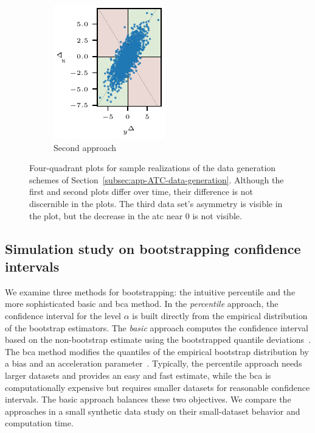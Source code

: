 \documentclass[pdflatex]{sn-jnl}
\theoremstyle{plain}%
\theoremstyle{definition}
\begin{document}
\begin{figure}
\begin{subfigure}{0.24\textwidth}
    \end{subfigure}\hspace{0.01\textwidth}
    \begin{subfigure}{0.24\textwidth}
        \includegraphics{plots/illustrative_examples/appendix_4q_dgp2}
        \caption{Second approach}
    \end{subfigure}
    \caption[Four-quadrant plots for sample realizations of the data generation schemes of Section~\ref{subsec:app-ATC-data-generation}.]{Four-quadrant plots for sample realizations of the data generation schemes of Section~\ref{subsec:app-ATC-data-generation}. Although the first and second plots differ over time, their difference is not discernible in the plots. The third data set's asymmetry is visible in the plot, but the decrease in the \ac{atc} near 0 is not visible. }
    \label{fig:appendix_dgps}
\end{figure}

\subsection{Simulation study on bootstrapping confidence intervals}\label{subsec:appendix-aatc-bootstrap}


We examine three methods for bootstrapping: the intuitive percentile and the more sophisticated basic and \ac{bca} method.
In the \textit{percentile} approach, the confidence interval for the level $\alpha$ is built directly from the empirical distribution of the bootstrap estimators.
The \textit{basic} approach computes the confidence interval based on the non-bootstrap estimate using the bootstrapped quantile deviations~\citep{Davison1997}.
The \ac{bca} method modifies the quantiles of the empirical bootstrap distribution by a bias and an acceleration parameter~\citep{Efron1987}.
Typically, the percentile approach needs larger datasets and provides an easy and fast estimate, while the \ac{bca} is computationally expensive but requires smaller datasets for reasonable confidence intervals.
The basic approach balances these two objectives.
We compare the approaches in a small synthetic data study on their small-dataset behavior and computation time.
\end{document}
